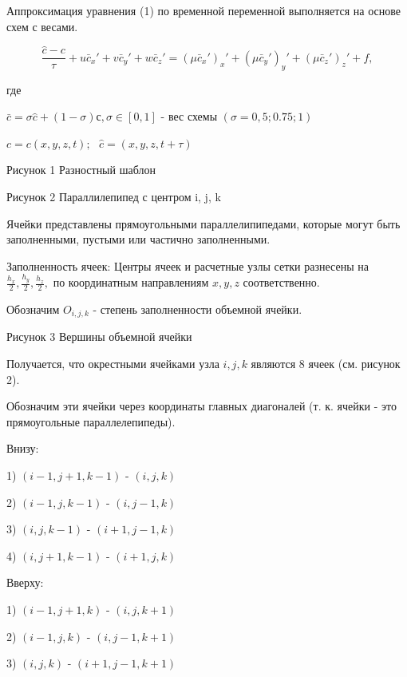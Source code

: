 \documentclass[12pt]{article}
\begin{document}
Аппроксимация уравнения (1) по временной переменной выполняется на основе схем с весами. 

\begin{equation}
	\frac{\hat c - c}{\tau} + u\bar{c}_x' + v\bar{c}_y' + w\bar{c}_z' = (\mu\bar{c}_x')_x' + (\mu\bar{c}_y')_y' + (\mu\bar{c}_z')_z' + f ,		
\end{equation}

где  

$\bar{c} = \sigma\hat c + (1 - \sigma) с , \sigma \in [0,1] $ - вес схемы $(\sigma = 0,5; 0.75; 1)$

$c=c(x, y, z, t);$ $ $ $\hat c = (x, y, z, t + \tau)  $

\begin{center}
Рисунок 1
Разностный шаблон
\end{center}


\begin{center}
Рисунок 2
Параллилепипед с центром i, j, k
\end{center}

Ячейки представлены прямоугольными параллелипипедами, которые могут быть заполненными, пустыми или частично заполненными. 

Заполненность ячеек:
Центры ячеек и расчетные узлы сетки разнесены на $ \frac{h_x}{2}, \frac{h_y}{2}, \frac{h_z}{2}, $ по координатным направлениям $x, y, z$ соответственно.

Обозначим $O_{i,j,k}$ - степень заполненности объемной ячейки. 

\begin{center}
	Рисунок 3
	Вершины объемной ячейки
\end{center}

Получается, что окрестными ячейками узла ${i,j,k}$ являются 8 ячеек (см. рисунок 2).

Обозначим эти ячейки через координаты главных диагоналей (т. к. ячейки - это прямоугольные параллелепипеды).

Внизу:

1) ${(i-1,j+1,k-1)}$ - ${(i,j,k)}$ 

2) ${(i-1,j,k-1)}$ - ${(i,j-1,k)}$ 

3) ${(i,j,k-1)}$ - ${(i+1,j-1,k)}$ 

4) ${(i,j+1,k-1)}$ - ${(i+1,j,k)}$ 

Вверху:

1) ${(i-1,j+1,k)}$ - ${(i,j,k+1)}$ 

2) ${(i-1,j,k)}$ - ${(i,j-1,k+1)}$ 

3) ${(i,j,k)}$ - ${(i+1,j-1,k+1)}$ 
\end{document}
